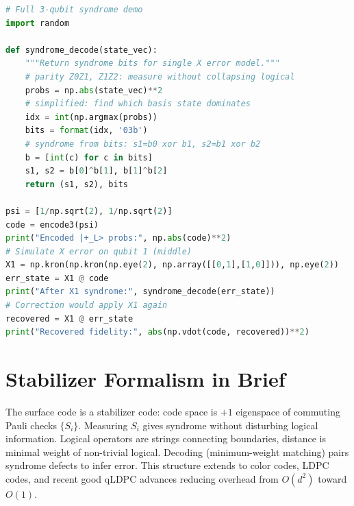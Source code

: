 \begin{lstlisting}[language=Python]
# Full 3-qubit syndrome demo
import random

def syndrome_decode(state_vec):
    """Return syndrome bits for single X error model."""
    # parity Z0Z1, Z1Z2: measure without collapsing logical
    probs = np.abs(state_vec)**2
    # simplified: find which basis state dominates
    idx = int(np.argmax(probs))
    bits = format(idx, '03b')
    # syndrome from bits: s1=b0 xor b1, s2=b1 xor b2
    b = [int(c) for c in bits]
    s1, s2 = b[0]^b[1], b[1]^b[2]
    return (s1, s2), bits

psi = [1/np.sqrt(2), 1/np.sqrt(2)]
code = encode3(psi)
print("Encoded |+_L> probs:", np.abs(code)**2)
# Simulate X error on qubit 1 (middle)
X1 = np.kron(np.kron(np.eye(2), np.array([[0,1],[1,0]])), np.eye(2))
err_state = X1 @ code
print("After X1 syndrome:", syndrome_decode(err_state))
# Correction would apply X1 again
recovered = X1 @ err_state
print("Recovered fidelity:", abs(np.vdot(code, recovered))**2)
\end{lstlisting}


\section{Stabilizer Formalism in Brief}
The surface code is a stabilizer code: code space is $+1$ eigenspace of commuting Pauli checks $\{S_i\}$. Measuring $S_i$ gives syndrome without disturbing logical information. Logical operators are strings connecting boundaries, distance is minimal weight of non-trivial logical. Decoding (minimum-weight matching) pairs syndrome defects to infer error. This structure extends to color codes, LDPC codes, and recent good qLDPC advances reducing overhead from $O(d^2)$ toward $O(1)$.

